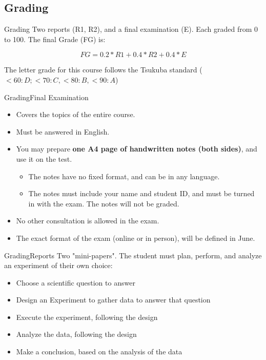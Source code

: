 \documentclass{beamer}
\begin{document}
\begin{CJK}{UTF8}{ipxm}


\subsection{Grading}
\begin{frame}{Grading}
  Two reports (R1, R2), and a final examination (E). Each graded from 0 to 100.
  The final Grade (FG) is:

  \begin{equation*}
    FG = 0.2*R1 + 0.4*R2 + 0.4*E
  \end{equation*}
  \bigskip

  The letter grade for this course follows the Tsukuba standard ($< 60: D; < 70: C, < 80: B, < 90: A$)
\end{frame}

\begin{frame}{Grading}{Final Examination}
  \begin{itemize}
    \item Covers the topics of the entire course.
    \item Must be answered in English.
    \item You may prepare {\bf one A4 page of handwritten notes (both sides)}, and use it on the test.
    \begin{itemize}
      \item The notes have no fixed format, and can be in any language.
      \item The notes must include your name and student ID, and must be turned in with the exam. The notes will not be graded.
    \end{itemize}
    \item No other consultation is allowed in the exam.
    \item The exact format of the exam (online or in person), will be defined in June.
  \end{itemize}
\end{frame}

\begin{frame}{Grading}{Reports}
  Two "mini-papers". The student must plan, perform, and analyze an experiment of their own choice:\bigskip

  \begin{itemize}
    \item Choose a scientific question to answer
    \item Design an Experiment to gather data to answer that question
    \item Execute the experiment, following the design
    \item Analyze the data, following the design
    \item Make a conclusion, based on the analysis of the data
  \end{itemize}
\end{frame}


\end{CJK}
\end{document}
